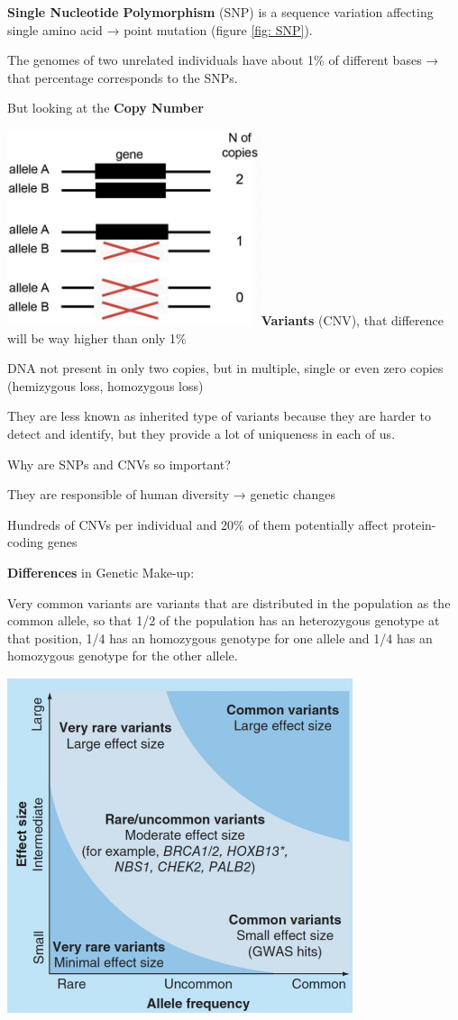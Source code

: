 \textbf{Single Nucleotide Polymorphism} (SNP) is a sequence variation affecting
single amino acid → point mutation (figure \ref{fig: SNP}).

The genomes of two unrelated individuals have about 1\% of different bases →
that percentage corresponds to the SNPs.

But looking at the \textbf{Copy Number}

\includegraphics[width=2.93475in,height=2.26167in]{image3.jpeg}\textbf{Variants}
(CNV), that difference will be way higher than only 1\%

DNA not present in only two copies, but in multiple, single or even zero copies
(hemizygous loss, homozygous loss)

They are less known as inherited type of variants because they are harder to
detect and identify, but they provide a lot of uniqueness in each of us.

Why are SNPs and CNVs so important?

They are responsible of human diversity → genetic changes

Hundreds of CNVs per individual and 20\% of them potentially affect protein-
coding genes

\textbf{Differences} in Genetic Make-up:

Very common variants are variants that are distributed in the population as the
common allele, so that 1/2 of the population has an heterozygous genotype at
that position, 1/4 has an homozygous genotype for one allele and 1/4 has an
homozygous genotype for the other allele.

\includegraphics[width=3.9928in,height=3.87812in]{image4.jpeg}

